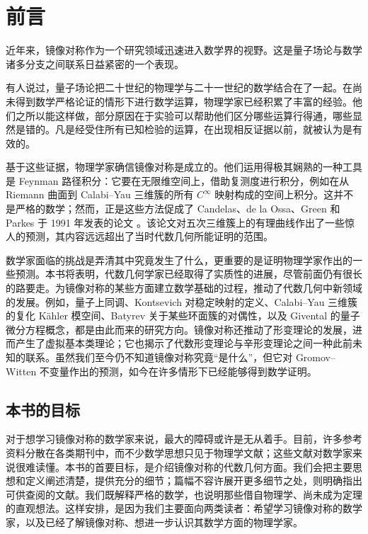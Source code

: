 \chapter*{前言}

近年来，镜像对称作为一个研究领域迅速进入数学界的视野。这是量子场论与数学诸多分支之间联系日益紧密的一个表现。

有人说过，量子场论把二十世纪的物理学与二十一世纪的数学结合在了一起。在尚未得到数学严格论证的情形下进行数学运算，物理学家已经积累了丰富的经验。他们之所以能这样做，部分原因在于实验可以帮助他们区分哪些运算行得通，哪些显然是错的。凡是经受住所有已知检验的运算，在出现相反证据以前，就被认为是有效的。

基于这些证据，物理学家确信镜像对称是成立的。他们运用得极其娴熟的一种工具是 Feynman 路径积分：它要在无限维空间上，借助复测度进行积分，例如在从 Riemann 曲面到 Calabi--Yau 三维簇的所有 $C^\infty$ 映射构成的空间上积分。这并不是严格的数学；然而，正是这些方法促成了 Candelas、de la Ossa、Green 和 Parkes 于 1991 年发表的论文 。该论文对五次三维簇上的有理曲线作出了一些惊人的预测，其内容远远超出了当时代数几何所能证明的范围。

数学家面临的挑战是弄清其中究竟发生了什么，更重要的是证明物理学家作出的一些预测。本书将表明，代数几何学家已经取得了实质性的进展，尽管前面仍有很长的路要走。为镜像对称的某些方面建立数学基础的过程，推动了代数几何中新领域的发展。例如，量子上同调、Kontsevich 对稳定映射的定义、Calabi--Yau 三维簇的复化 Kähler 模空间、Batyrev 关于某些环面簇的对偶性，以及 Givental 的量子微分方程概念，都是由此而来的研究方向。镜像对称还推动了形变理论的发展，进而产生了虚拟基本类理论；它也揭示了代数形变理论与辛形变理论之间一种此前未知的联系。虽然我们至今仍不知道镜像对称究竟“是什么”，但它对 Gromov--Witten 不变量作出的预测，如今在许多情形下已经能够得到数学证明。

\section*{本书的目标}
对于想学习镜像对称的数学家来说，最大的障碍或许是无从着手。目前，许多参考资料分散在各类期刊中，而不少数学思想只见于物理学文献；这些文献对数学家来说很难读懂。本书的首要目标，是介绍镜像对称的代数几何方面。我们会把主要思想和定义阐述清楚，提供充分的细节；篇幅不容许展开更多细节之处，则明确指出可供查阅的文献。我们既解释严格的数学，也说明那些借自物理学、尚未成为定理的直观想法。这样安排，是因为我们主要面向两类读者：希望学习镜像对称的数学家，以及已经了解镜像对称、想进一步认识其数学方面的物理学家。

